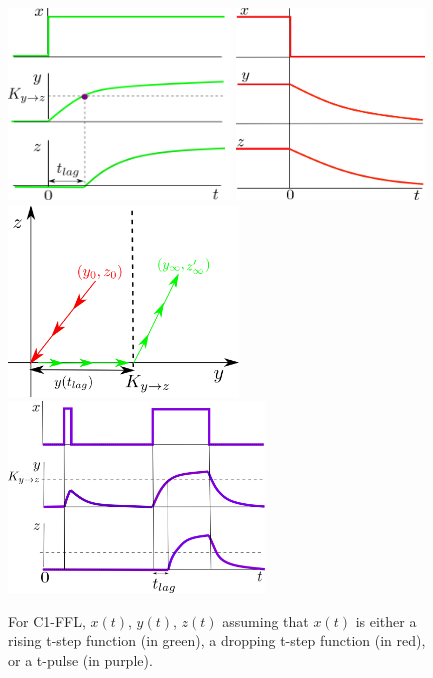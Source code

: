 \begin{figure}[h!]
\centering
\includegraphics[height=2in]
{autoregulons/c1-ffl-up-green.png}
\includegraphics[height=2in]
{autoregulons/c1-ffl-down-green.png}
\includegraphics[height=2in]
{autoregulons/two-paths-y-z-plane.png}
\includegraphics[height=2in]
{autoregulons/c1-ffl-up-down-green.png}
\caption{For C1-FFL, $x(t)$, $y(t)$, $z(t)$ assuming 
that $x(t)$ is either a rising
 t-step function (in green),
a dropping t-step function (in red),
or a t-pulse  (in purple).}
\label{fig-c1-ffl-triple}
\end{figure}

